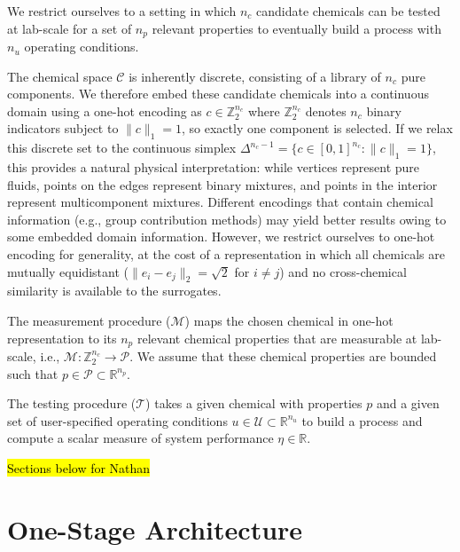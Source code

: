 \documentclass[preprint,12pt]{elsarticle}
\begin{document}
We restrict ourselves to a setting in which $n_c$ candidate chemicals can be tested at lab-scale for a set of $n_p$ relevant properties to eventually build a process with $n_u$ operating conditions.

The chemical space $\mathcal{C}$ is inherently discrete, consisting of a library of $n_c$ pure components. We therefore embed these candidate chemicals into a continuous domain using a one-hot encoding as $c\in\mathbb{Z}_{2}^{n_{c}}$ where $\mathbb{Z}_{2}^{n_{c}}$ denotes $n_c$ binary indicators subject to $\lVert c \rVert_1 = 1$, so exactly one component is selected. If we relax this discrete set to the continuous simplex $\Delta^{n_c-1} = \{c \in [0,1]^{n_c} : \lVert c \rVert_1 = 1\}$, this provides a natural physical interpretation: while vertices represent pure fluids, points on the edges represent binary mixtures, and points in the interior represent multicomponent mixtures. Different encodings that contain chemical information (e.g., group contribution methods) may yield better results owing to some embedded domain information. However, we restrict ourselves to one-hot encoding for generality, at the cost of a representation in which all chemicals are mutually equidistant ($\lVert e_i - e_j \rVert_2 = \sqrt{2}$ for $i \neq j$) and no cross-chemical similarity is available to the surrogates. 


The measurement procedure ($\mathcal{M}$) maps the chosen chemical in one-hot representation to its $n_{p}$ relevant chemical properties that are measurable at lab-scale, i.e., $\mathcal{M}:\mathbb{Z}_{2}^{n_{c}}\rightarrow \mathcal{P}$. We assume that these chemical properties are bounded such that $p\in \mathcal{P}\subset\mathbb{R}^{n_{p}}$.

The testing procedure ($\mathcal{T}$) takes a given chemical with properties $p$ and a given set of user-specified operating conditions $u\in\mathcal{U}\subset\mathbb{R}^{n_u}$ to build a process and compute a scalar measure of system performance $\eta\in\mathbb{R}$.





\hl{Sections below for Nathan}

\label{sec:architecture}
\section{One-Stage Architecture}
\end{document}

